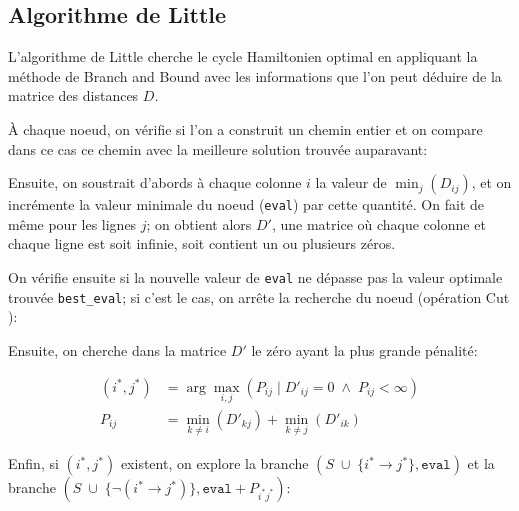 \documentclass[12pt]{article}
\begin{document}


\subsection{Algorithme de Little}

L'algorithme de Little cherche le cycle Hamiltonien optimal en appliquant la méthode de Branch and Bound avec les informations que l'on peut déduire de la matrice des distances $D$.

À chaque noeud, on vérifie si l'on a construit un chemin entier et on compare dans ce cas ce chemin avec la meilleure solution trouvée auparavant:



Ensuite, on soustrait d'abords à chaque colonne $i$ la valeur de $\min_{j}(D_{ij})$, et on incrémente la valeur minimale du noeud (\texttt{eval}) par cette quantité.
On fait de même pour les lignes $j$; on obtient alors $D'$, une matrice où chaque colonne et chaque ligne est soit infinie, soit contient un ou plusieurs zéros.



On vérifie ensuite si la nouvelle valeur de \texttt{eval} ne dépasse pas la valeur optimale trouvée \texttt{best\_eval}; si c'est le cas, on arrête la recherche du noeud (opération \og Cut \fg):



Ensuite, on cherche dans la matrice $D'$ le zéro ayant la plus grande pénalité:

\begin{align*}
  (i^{*}, j^{*}) &= \arg \max_{i,j}(P_{ij} \; | \; D'_{ij} = 0 \; \land \; P_{ij} < \infty) \\
  P_{ij} &= \min_{k \neq i}(D'_{kj}) + \min_{k \neq j}(D'_{ik})
\end{align*}



Enfin, si $(i^{*}, j^{*})$ existent, on explore la branche $(S \;\cup\; \{i^{*} \rightarrow j^{*}\}, \texttt{eval})$ et la branche $(S \;\cup\; \{\neg(i^{*} \rightarrow j^{*})\}, \texttt{eval} + P_{i^{*}j^{*}})$:


\end{document}
